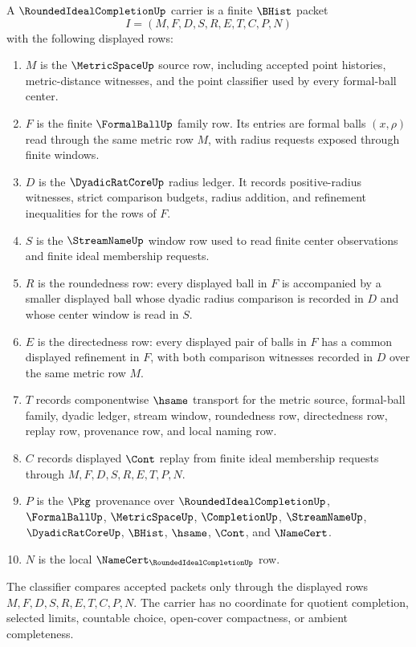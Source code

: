 \begin{definition}
\label{def:rounded-ideal-completion-carrier}
A $\RoundedIdealCompletionUp$ carrier is a finite $\BHist$ packet
$$
I=(M,F,D,S,R,E,T,C,P,N)
$$
with the following displayed rows:
\begin{enumerate}
\item $M$ is the $\MetricSpaceUp$ source row, including accepted point histories, metric-distance witnesses, and the point classifier used by every formal-ball center.
\item $F$ is the finite $\FormalBallUp$ family row. Its entries are formal balls $(x,\rho)$ read through the same metric row $M$, with radius requests exposed through finite windows.
\item $D$ is the $\DyadicRatCoreUp$ radius ledger. It records positive-radius witnesses, strict comparison budgets, radius addition, and refinement inequalities for the rows of $F$.
\item $S$ is the $\StreamNameUp$ window row used to read finite center observations and finite ideal membership requests.
\item $R$ is the roundedness row: every displayed ball in $F$ is accompanied by a smaller displayed ball whose dyadic radius comparison is recorded in $D$ and whose center window is read in $S$.
\item $E$ is the directedness row: every displayed pair of balls in $F$ has a common displayed refinement in $F$, with both comparison witnesses recorded in $D$ over the same metric row $M$.
\item $T$ records componentwise $\hsame$ transport for the metric source, formal-ball family, dyadic ledger, stream window, roundedness row, directedness row, replay row, provenance row, and local naming row.
\item $C$ records displayed $\Cont$ replay from finite ideal membership requests through $M,F,D,S,R,E,T,P,N$.
\item $P$ is the $\Pkg$ provenance over $\RoundedIdealCompletionUp$, $\FormalBallUp$, $\MetricSpaceUp$, $\CompletionUp$, $\StreamNameUp$, $\DyadicRatCoreUp$, $\BHist$, $\hsame$, $\Cont$, and $\NameCert$.
\item $N$ is the local $\NameCert_{\RoundedIdealCompletionUp}$ row.
\end{enumerate}
The classifier compares accepted packets only through the displayed rows $M,F,D,S,R,E,T,C,P,N$. The carrier has no coordinate for quotient completion, selected limits, countable choice, open-cover compactness, or ambient completeness.
\end{definition}

